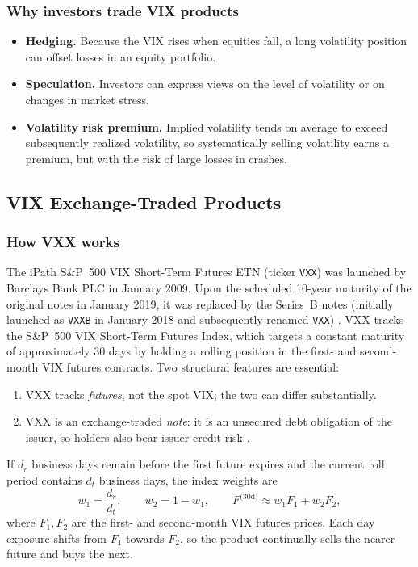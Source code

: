 \subsubsection{Why investors trade VIX products}

\begin{itemize}
  \item \textbf{Hedging.} Because the VIX rises when equities fall, a long volatility position can offset losses in an equity portfolio.
  \item \textbf{Speculation.} Investors can express views on the level of volatility or on changes in market stress.
  \item \textbf{Volatility risk premium.} Implied volatility tends on average to exceed subsequently realized volatility, so systematically selling volatility earns a premium, but with the risk of large losses in crashes.
\end{itemize}

\subsection{VIX Exchange-Traded Products}
\subsubsection{How VXX works}

The iPath S\&P~500 VIX Short-Term Futures ETN (ticker \texttt{VXX}) was launched by Barclays Bank PLC in January 2009. Upon the scheduled 10-year maturity of the original notes in January 2019, it was replaced by the Series~B notes (initially launched as \texttt{VXXB} in January 2018 and subsequently renamed \texttt{VXX}) \cite{vxx}. VXX tracks the S\&P~500 VIX Short-Term Futures Index, which targets a constant maturity of approximately 30 days by holding a rolling position in the first- and second-month VIX futures contracts. Two structural features are essential:

\begin{enumerate}
  \item VXX tracks \emph{futures}, not the spot VIX; the two can differ substantially.
  \item VXX is an exchange-traded \emph{note}: it is an unsecured debt obligation of the issuer, so holders also bear issuer credit risk \cite{vxx}.
\end{enumerate}

If $d_r$ business days remain before the first future expires and the current roll period contains $d_t$ business days, the index weights are
\begin{equation}
  w_1 = \frac{d_r}{d_t},\qquad w_2 = 1-w_1,
  \qquad
  F^{\text{(30d)}} \approx w_1F_1 + w_2F_2,
  \label{eq:weights}
\end{equation}
where $F_1,F_2$ are the first- and second-month VIX futures prices. Each day exposure shifts from $F_1$ towards $F_2$, so the product continually sells the nearer future and buys the next.

